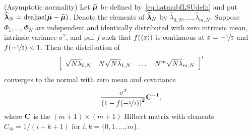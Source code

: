 \documentclass[journal]{IEEEtran}
\begin{document}



 
\begin{theorem} \label{thm:asymp_proof} (Asymptotic normality)
Let $\widehat{\boldsymbol{\mu}}$ be defined by~\eqref{eq:hatmubfLSUdefn} and put $\widehat{\boldsymbol{\lambda}}_N = \operatorname{dealias}(\tilde{\boldsymbol{\mu}} - \widehat{\boldsymbol{\mu}})$.  Denote the elements of $\widehat{\boldsymbol{\lambda}}_N$ by $\widehat{\lambda}_{0,N}, \dots, \widehat{\lambda}_{m,N}$.  Suppose $\Phi_1, \dots, \Phi_N$ are independent and identically distributed with zero intrinsic mean, intrinsic variance $\sigma^2$, and pdf $f$ such that $f(\left\langle x \right\rangle)$ is continuous at $x = -\nicefrac{1}{2}$ and $f(-\nicefrac{1}{2}) < 1$.  Then the distribution of
\[
\left[
\begin{array}
[c]{cccc}%
\sqrt{N} \widehat{\lambda}_{0,N} & N \sqrt{N}\widehat{\lambda}_{1,N}  & \dots & N^m\sqrt{N} \widehat{\lambda}_{m,N}
\end{array}
\right]^\prime
\]
converges to the normal with zero mean and covariance
\[
\frac{\sigma^2}{\left(1-f( -\nicefrac{1}{2}) \right)^{2}} \mathbf{C}^{-1},
\]
where $\mathbf{C}$ is the $(m+1)\times (m+1)$ Hilbert matrix with elements $C_{ik} = 1/(i + k + 1)$ for $i,k = \{0, 1, \dots, m\}$.
\end{theorem}
\end{document}
